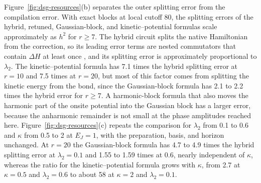 \documentclass[pra,twocolumn,superscriptaddress,nofootinbib,floatfix]{revtex4-2}
\theoremstyle{remark}
\newcommand{\revcolor}{\color{blue}}
\DeclareRobustCommand{\rev}[1]{{\revcolor #1}}
\begin{document}
\rev{Figure~\ref{fig:dsg-resources}(b) separates the outer splitting error from the compilation error.} \rev{With exact blocks at local cutoff 80, the splitting errors of the hybrid, retuned, Gaussian-block, and kinetic--potential formulas scale approximately as \(h^2\) for \(r\ge7\).} \rev{The hybrid circuit splits the native Hamiltonian from the correction, so its leading error terms are nested commutators that contain \(\Delta H\) at least once \cite{Childs2021Trotter}, and its splitting error is approximately proportional to \(\lambda_2\).} \rev{The kinetic--potential formula has 7.1 times the hybrid splitting error at \(r=10\) and 7.5 times at \(r=20\), but most of this factor comes from splitting the kinetic energy from the bond, since the Gaussian-block formula has 2.1 to 2.2 times the hybrid error for \(r\ge7\).} \rev{A harmonic-block formula that also moves the harmonic part of the onsite potential into the Gaussian block has a larger error, because the anharmonic remainder is not small at the phase amplitudes reached here.} \rev{Figure~\ref{fig:dsg-resources}(c) repeats the comparison for \(\lambda_2\) from 0.1 to 0.6 and \(\kappa\) from 0.5 to 2 at \(E_J=1\), with the preparation, basis, and horizon unchanged.} \rev{At \(r=20\) the Gaussian-block formula has 4.7 to 4.9 times the hybrid splitting error at \(\lambda_2=0.1\) and 1.55 to 1.59 times at 0.6, nearly independent of \(\kappa\), whereas the ratio for the kinetic--potential formula grows with \(\kappa\), from 2.7 at \(\kappa=0.5\) and \(\lambda_2=0.6\) to about 58 at \(\kappa=2\) and \(\lambda_2=0.1\).}
\end{document}
